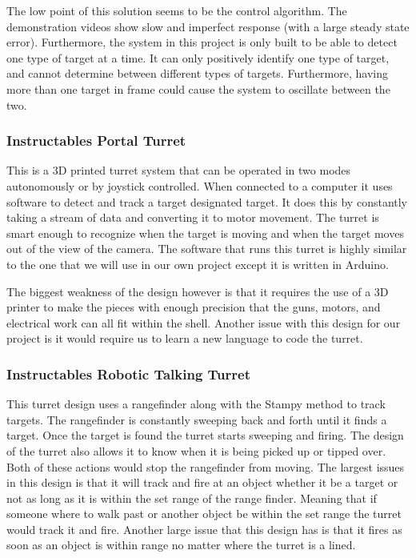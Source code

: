 The low point of this solution seems to be the control algorithm. The demonstration videos show slow and imperfect response (with a large steady state error). Furthermore, the system in this project is only built to be able to detect one type of target at a time. It can only positively identify one type of target, and cannot determine between different types of targets. Furthermore, having more than one target in frame could cause the system to oscillate between the two.

\subsubsection{Instructables Portal Turret}
This is a 3D printed turret system that can be operated in two modes autonomously or by joystick controlled. When connected to a computer it uses software to detect and track a target designated target. It does this by constantly taking a stream of data and converting it to motor movement. The turret is smart enough to recognize when the target is moving and when the target moves out of the view of the camera.  The software that runs this turret is highly similar to the one that we will use in our own project except it is written in Arduino. 

The biggest weakness of the design however is that it requires the use of a 3D printer to make the pieces with enough precision that the guns, motors, and  electrical work can all fit within the shell. Another issue with this design for our project is it would require us to learn a new language to code the turret.  

\subsubsection{Instructables Robotic Talking Turret}
This turret design uses a rangefinder along with the Stampy method to track targets. The rangefinder is constantly sweeping back and forth until it finds a target. Once the target is found the turret starts sweeping and firing. The design of the turret also allows it to know when it is being picked up or tipped over. Both of these actions would stop the rangefinder from moving. 
The largest issues in this design is that it will track and fire at an object whether it be a target or not as long as it is within the set range of the range finder. Meaning that if someone where to walk past or another object be within the set range the turret would track it and fire. Another large issue that this design has is that it fires as soon as an object is within range no matter where the turret is a lined.

